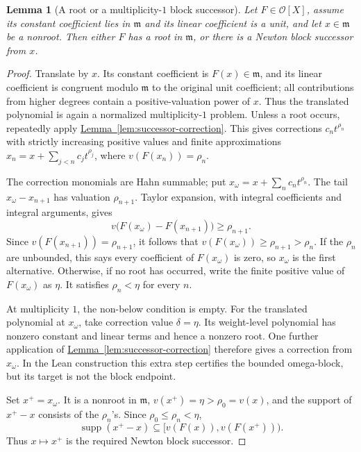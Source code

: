 \documentclass[11pt]{article}
\newcommand{\Val}{v}
\newcommand{\Supp}{\operatorname{supp}}
\newcommand{\Ocal}{\mathcal O}
\newcommand{\namedref}[2]{\hyperref[#2]{#1~\ref*{#2}}}
\theoremstyle{proofnote}
\newtheorem{lemma}[theorem]{Lemma}
\begin{document}
\begin{lemma}[A root or a multiplicity-\(1\) block successor]
\label{lem:one-block-successor}
  Let \(F\in\Ocal[X]\), assume its constant coefficient lies in
  \(\mathfrak m\) and its linear coefficient is a unit, and let
  \(x\in\mathfrak m\) be a nonroot.  Then either \(F\) has a root in
  \(\mathfrak m\), or there is a Newton block successor from \(x\).
\end{lemma}
\begin{proof}
  Translate by \(x\).  Its constant coefficient is \(F(x)\in\mathfrak m\),
  and its linear coefficient is congruent modulo \(\mathfrak m\) to the
  original unit coefficient; all contributions from higher degrees contain a
  positive-valuation power of \(x\).  Thus the translated polynomial is again
  a normalized multiplicity-\(1\) problem.  Unless a root occurs, repeatedly
  apply \namedref{Lemma}{lem:successor-correction}.  This gives corrections
  \(c_nt^{\rho_n}\) with strictly increasing positive values and finite
  approximations
  \(x_n=x+\sum_{j<n}c_jt^{\rho_j}\), where
  \(\Val(F(x_n))=\rho_n\).

  The correction monomials are Hahn summable; put
  \(x_\omega=x+\sum_nc_nt^{\rho_n}\).  The tail
  \(x_\omega-x_{n+1}\) has valuation \(\rho_{n+1}\).  Taylor expansion, with
  integral coefficients and integral arguments, gives
  \[
    \Val\bigl(F(x_\omega)-F(x_{n+1})\bigr)\ge\rho_{n+1}.
  \]
  Since \(\Val(F(x_{n+1}))=\rho_{n+1}\), it follows that
  \(\Val(F(x_\omega))\ge\rho_{n+1}>\rho_n\).  If the \(\rho_n\) are unbounded, this says
  every coefficient of \(F(x_\omega)\) is zero, so \(x_\omega\) is the first
  alternative.  Otherwise, if no root has occurred, write the finite positive
  value of \(F(x_\omega)\) as \(\eta\).  It satisfies
  \(\rho_n<\eta\) for every \(n\).

  At multiplicity \(1\), the non-below condition is empty.  For the
  translated polynomial at \(x_\omega\), take correction value
  \(\delta=\eta\).  Its weight-level polynomial has nonzero constant and
  linear terms and hence a nonzero root.  One further application of
  \namedref{Lemma}{lem:successor-correction} therefore gives a correction
  from \(x_\omega\).  In the Lean construction this extra step certifies the
  bounded omega-block, but its target is not the block endpoint.

  Set \(x^+=x_\omega\).  It is a nonroot in \(\mathfrak m\),
  \(v(x^+)=\eta>\rho_0=v(x)\), and the support of \(x^+-x\) consists of the
  \(\rho_n\)'s.  Since \(\rho_0\le\rho_n<\eta\),
  \[
    \Supp(x^+-x)\subseteq[\Val(F(x)),\Val(F(x^+))).
  \]
  Thus \(x\mapsto x^+\) is the required Newton block successor.
\end{proof}
\end{document}

